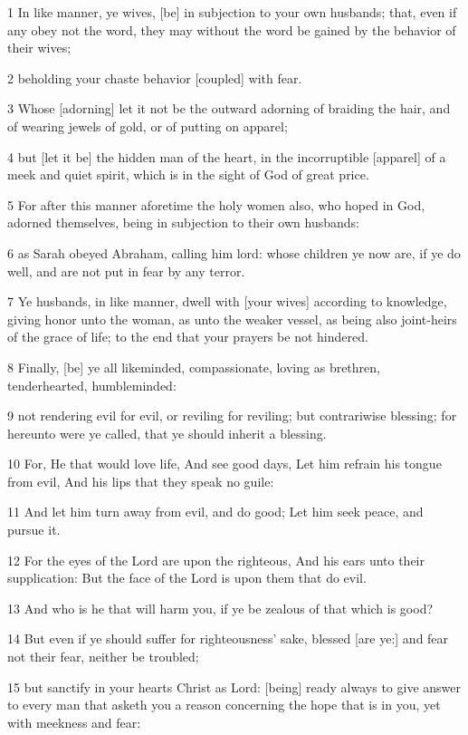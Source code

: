 \par 1 In like manner, ye wives, [be] in subjection to your own husbands; that, even if any obey not the word, they may without the word be gained by the behavior of their wives;
\par 2 beholding your chaste behavior [coupled] with fear.
\par 3 Whose [adorning] let it not be the outward adorning of braiding the hair, and of wearing jewels of gold, or of putting on apparel;
\par 4 but [let it be] the hidden man of the heart, in the incorruptible [apparel] of a meek and quiet spirit, which is in the sight of God of great price.
\par 5 For after this manner aforetime the holy women also, who hoped in God, adorned themselves, being in subjection to their own husbands:
\par 6 as Sarah obeyed Abraham, calling him lord: whose children ye now are, if ye do well, and are not put in fear by any terror.
\par 7 Ye husbands, in like manner, dwell with [your wives] according to knowledge, giving honor unto the woman, as unto the weaker vessel, as being also joint-heirs of the grace of life; to the end that your prayers be not hindered.
\par 8 Finally, [be] ye all likeminded, compassionate, loving as brethren, tenderhearted, humbleminded:
\par 9 not rendering evil for evil, or reviling for reviling; but contrariwise blessing; for hereunto were ye called, that ye should inherit a blessing.
\par 10 For, He that would love life, And see good days, Let him refrain his tongue from evil, And his lips that they speak no guile:
\par 11 And let him turn away from evil, and do good; Let him seek peace, and pursue it.
\par 12 For the eyes of the Lord are upon the righteous, And his ears unto their supplication: But the face of the Lord is upon them that do evil.
\par 13 And who is he that will harm you, if ye be zealous of that which is good?
\par 14 But even if ye should suffer for righteousness' sake, blessed [are ye:] and fear not their fear, neither be troubled;
\par 15 but sanctify in your hearts Christ as Lord: [being] ready always to give answer to every man that asketh you a reason concerning the hope that is in you, yet with meekness and fear:
